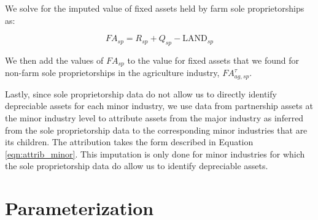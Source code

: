 \documentclass[article,11pt,letterpaper,fleqn]{article}
\theoremstyle{definition}
\numberwithin{equation}{section}
\begin{document}
We solve for the imputed value of fixed assets held by farm sole proprietorships as: 

\begin{equation}
{FA}_{sp}=R_{sp}+Q_{sp}-\text{LAND}_{sp}
\end{equation}

We then add the values of ${FA}_{sp}$ to the value for fixed assets that we found for non-farm sole proprietorships in the agriculture industry, ${FA}^{\tau}_{ag,sp}$.

Lastly, since sole proprietorship data do not allow us to directly identify depreciable assets for each minor industry, we use data from partnership assets at the minor industry level to attribute assets from the major industry as inferred from the sole proprietorship data to the corresponding minor industries that are its children.  The attribution takes the form described in Equation \ref{eqn:attrib_minor}.  This imputation is only done for minor industries for which the sole proprietorship data do allow us to identify depreciable assets.  

%
%
%
%
%
%
%
%
%
\section{Parameterization}

\end{document}
